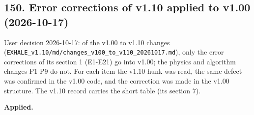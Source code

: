 \documentclass[english,a4paper]{my_memo}
\begin{document}
\subsection{150. Error corrections of v1.10 applied to v1.00 (2026-10-17)}\label{150-error-corrections-of-v110-applied-to-v100-2026-10-17}

User decision 2026-10-17: of the v1.00 to v1.10 changes (\texttt{EXHALE\_v1.10/md/changes\_v100\_to\_v110\_20261017.md}), only the error corrections of its section 1 (E1-E21) go into v1.00; the physics and algorithm changes P1-P9 do not. For each item the v1.10 hunk was read, the same defect was confirmed in the v1.00 code, and the correction was made in the v1.00 structure. The v1.10 record carries the short table (its section 7).

\textbf{Applied.}
\end{document}
